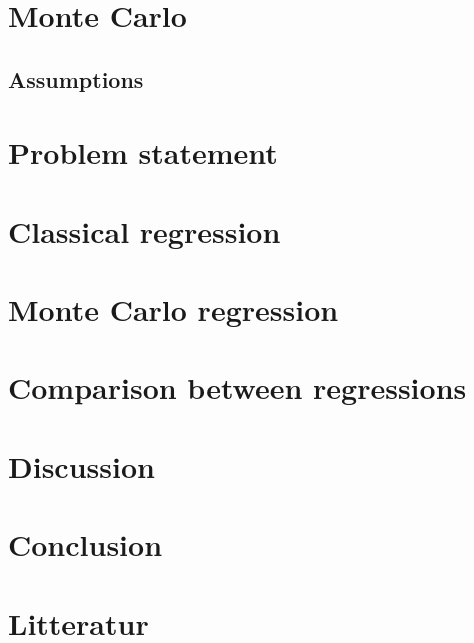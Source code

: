 \documentclass{article}
\begin{document}
	\section{Monte Carlo}
	\subsection{Assumptions}
	\newpage
	\section{Problem statement}
	\newpage
	\section{Classical regression}
	\newpage
	\section{Monte Carlo regression}
	\newpage
	\section{Comparison between regressions}
	\newpage
	\section{Discussion}
	\newpage
	\section{Conclusion}
	\newpage
 	\section{Litteratur}
  
\end{document}
